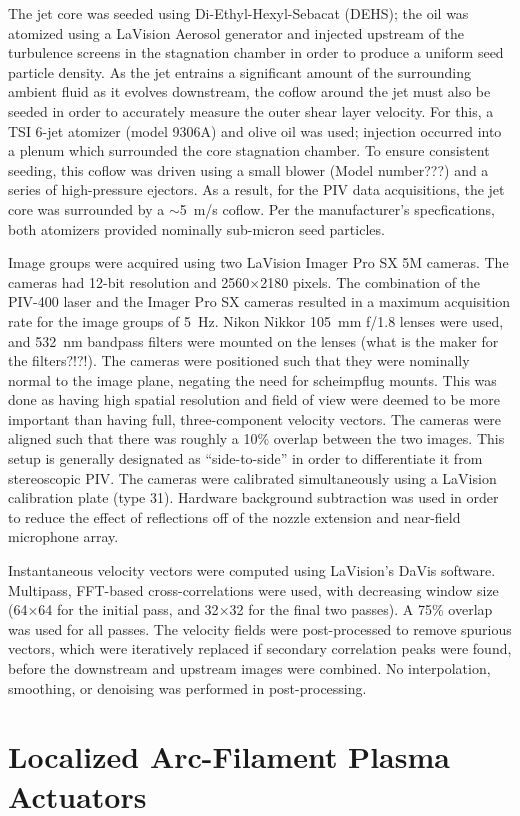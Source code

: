 The jet core was seeded using Di-Ethyl-Hexyl-Sebacat (DEHS); the oil was atomized using a LaVision Aerosol generator and injected upstream of the turbulence screens in the stagnation chamber in order to produce a uniform seed particle density.
As the jet entrains a significant amount of the surrounding ambient fluid as it evolves downstream, the coflow around the jet must also be seeded in order to accurately measure the outer shear layer velocity.
For this, a TSI 6-jet atomizer (model 9306A) and olive oil was used; injection occurred into a plenum which surrounded the core stagnation chamber.
To ensure consistent seeding, this coflow was driven using a small blower (Model number???) and a series of high-pressure ejectors. 
As a result, for the PIV data acquisitions, the jet core was surrounded by a $\sim$5~m/s coflow. 
Per the manufacturer's specfications, both atomizers provided nominally sub-micron seed particles.

Image groups were acquired using two LaVision Imager Pro SX 5M cameras.
The cameras had 12-bit resolution and 2560$\times$2180 pixels.
The combination of the PIV-400 laser and the Imager Pro SX cameras resulted in a maximum acquisition rate for the image groups of 5~Hz.
Nikon Nikkor 105~mm f/1.8 lenses were used, and 532~nm bandpass filters were mounted on the lenses (what is the maker for the filters?!?!).
The cameras were positioned such that they were nominally normal to the image plane, negating the need for scheimpflug mounts.
This was done as having high spatial resolution and field of view were deemed to be more important than having full, three-component velocity vectors.
The cameras were aligned such that there was roughly a 10\% overlap between the two images.
This setup is generally designated as ``side-to-side'' in order to differentiate it from stereoscopic PIV.
The cameras were calibrated simultaneously using a LaVision calibration plate (type 31). 
Hardware background subtraction was used in order to reduce the effect of reflections off of the nozzle extension and near-field microphone array.

Instantaneous velocity vectors were computed using LaVision's DaVis software.
Multipass, FFT-based cross-correlations were used, with decreasing window size (64$\times$64 for the initial pass, and 32$\times$32 for the final two passes).
A 75\% overlap was used for all passes.
The velocity fields were post-processed to remove spurious vectors, which were iteratively replaced if secondary correlation peaks were found, before the downstream and upstream images were combined.
No interpolation, smoothing, or denoising was performed in post-processing.

\section{Localized Arc-Filament Plasma Actuators}